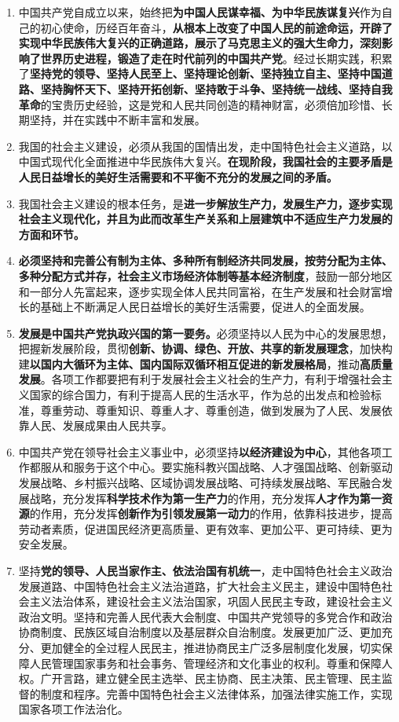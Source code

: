 \documentclass[UTF8,11pt,a4paper]{ctexart}
\begin{document}
\begin{enumerate}[label=\arabic*., leftmargin=2.3em]
\item 中国共产党自成立以来，始终把\textbf{为中国人民谋幸福、为中华民族谋复兴}作为自己的初心使命，历经百年奋斗，\textbf{从根本上改变了中国人民的前途命运，开辟了实现中华民族伟大复兴的正确道路，展示了马克思主义的强大生命力，深刻影响了世界历史进程，锻造了走在时代前列的中国共产党}。经过长期实践，积累了\textbf{坚持党的领导、坚持人民至上、坚持理论创新、坚持独立自主、坚持中国道路、坚持胸怀天下、坚持开拓创新、坚持敢于斗争、坚持统一战线、坚持自我革命}的宝贵历史经验，这是党和人民共同创造的精神财富，必须倍加珍惜、长期坚持，并在实践中不断丰富和发展。
\item 我国的社会主义建设，必须从我国的国情出发，走中国特色社会主义道路，以中国式现代化全面推进中华民族伟大复兴。\textbf{在现阶段，我国社会的主要矛盾是人民日益增长的美好生活需要和不平衡不充分的发展之间的矛盾。}
\item 我国社会主义建设的根本任务，是\textbf{进一步解放生产力，发展生产力，逐步实现社会主义现代化，并且为此而改革生产关系和上层建筑中不适应生产力发展的方面和环节。}
\item \textbf{必须坚持和完善公有制为主体、多种所有制经济共同发展，按劳分配为主体、多种分配方式并存，社会主义市场经济体制等基本经济制度}，鼓励一部分地区和一部分人先富起来，逐步实现全体人民共同富裕，在生产发展和社会财富增长的基础上不断满足人民日益增长的美好生活需要，促进人的全面发展。
\item \textbf{发展是中国共产党执政兴国的第一要务。}必须坚持以人民为中心的发展思想，把握新发展阶段，贯彻\textbf{创新、协调、绿色、开放、共享的新发展理念}，加快构建\textbf{以国内大循环为主体、国内国际双循环相互促进的新发展格局}，推动\textbf{高质量发展}。各项工作都要把有利于发展社会主义社会的生产力，有利于增强社会主义国家的综合国力，有利于提高人民的生活水平，作为总的出发点和检验标准，尊重劳动、尊重知识、尊重人才、尊重创造，做到发展为了人民、发展依靠人民、发展成果由人民共享。
\item 中国共产党在领导社会主义事业中，必须坚持\textbf{以经济建设为中心}，其他各项工作都服从和服务于这个中心。要实施科教兴国战略、人才强国战略、创新驱动发展战略、乡村振兴战略、区域协调发展战略、可持续发展战略、军民融合发展战略，充分发挥\textbf{科学技术作为第一生产力}的作用，充分发挥\textbf{人才作为第一资源}的作用，充分发挥\textbf{创新作为引领发展第一动力}的作用，依靠科技进步，提高劳动者素质，促进国民经济更高质量、更有效率、更加公平、更可持续、更为安全发展。
\item 坚持\textbf{党的领导、人民当家作主、依法治国有机统一}，走中国特色社会主义政治发展道路、中国特色社会主义法治道路，扩大社会主义民主，建设中国特色社会主义法治体系，建设社会主义法治国家，巩固人民民主专政，建设社会主义政治文明。坚持和完善人民代表大会制度、中国共产党领导的多党合作和政治协商制度、民族区域自治制度以及基层群众自治制度。发展更加广泛、更加充分、更加健全的全过程人民民主，推进协商民主广泛多层制度化发展，切实保障人民管理国家事务和社会事务、管理经济和文化事业的权利。尊重和保障人权。广开言路，建立健全民主选举、民主协商、民主决策、民主管理、民主监督的制度和程序。完善中国特色社会主义法律体系，加强法律实施工作，实现国家各项工作法治化。

\end{enumerate}
\end{document}
